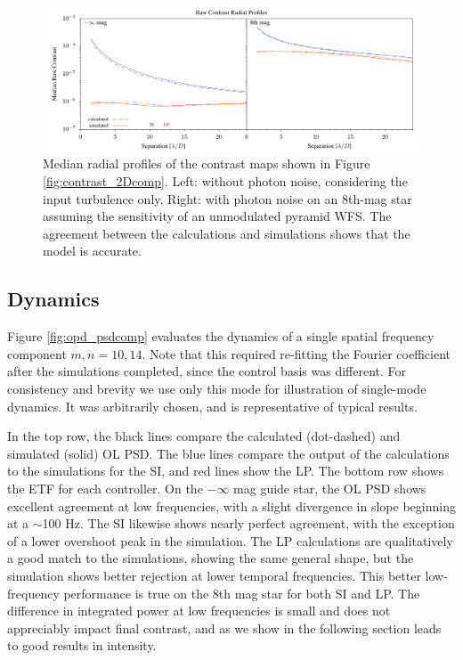 \documentclass[10pt,preprint]{aastex631}
\begin{document}
\begin{figure}
\hspace{-0.3in}
\includegraphics[width=6.5in]{contrastRP.pdf}
\caption{Median radial profiles of the contrast maps shown in Figure \ref{fig:contrast_2Dcomp}.  Left: without photon noise, considering the input turbulence only.  Right: with photon noise on an 8th-mag star assuming the sensitivity of an unmodulated pyramid WFS. The agreement between the calculations and simulations shows that the model is accurate. \label{fig:contrast_radprof}}
\end{figure}

\subsection{Dynamics}
Figure \ref{fig:opd_psdcomp} evaluates the dynamics of a single spatial frequency component  $m,n = 10,14$.  Note that this required re-fitting the Fourier coefficient after the simulations completed, since the control basis was different.  For consistency and brevity we use only this mode for illustration of single-mode dynamics.  It was arbitrarily chosen, and is representative of typical results.

In the top row, the black lines compare the calculated (dot-dashed) and simulated (solid) OL PSD.  The blue lines compare the output of the calculations to the simulations for the SI, and red lines show the LP.  The bottom row shows the ETF for each controller.  On the $-\infty$ mag guide star, the OL PSD shows excellent agreement at low frequencies, with a slight divergence in slope beginning at a $\sim$100 Hz. The SI likewise shows nearly perfect agreement, with the exception of a lower overshoot peak in the simulation.  The LP calculations are qualitatively a good match to the simulations, showing the same general shape, but the simulation shows better rejection at lower temporal frequencies.  This better low-frequency performance is true on the 8th mag star for both SI and LP.  The difference in integrated power at low frequencies is small and does not appreciably impact final contrast, and as we show in the following section leads to good results in intensity.  
\end{document}
